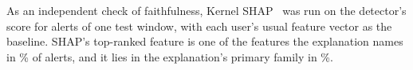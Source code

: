 As an independent check of faithfulness, Kernel SHAP~\cite{lundberg2017shap} was run on the
detector's score for \ShapN{} alerts of one test window, with each user's usual feature vector as
the baseline. SHAP's top-ranked feature is one of the features the explanation names in
\ShapTopNamed\% of alerts, and it lies in the explanation's primary family in \ShapFamilyAgree\%.
